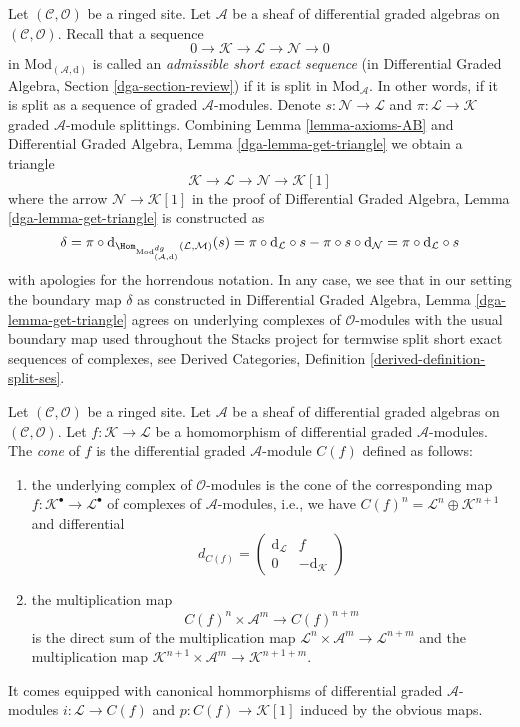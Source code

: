 \noindent
Let $(\mathcal{C}, \mathcal{O})$ be a ringed site.
Let $\mathcal{A}$ be a sheaf of differential graded algebras
on $(\mathcal{C}, \mathcal{O})$.
Recall that a sequence
$$
0 \to \mathcal{K} \to \mathcal{L} \to \mathcal{N} \to 0
$$
in $\text{Mod}_{(\mathcal{A}, \text{d})}$
is called an {\it admissible short exact sequence}
(in Differential Graded Algebra, Section \ref{dga-section-review})
if it is split in $\text{Mod}_\mathcal{A}$. In other words, if it is split
as a sequence of graded $\mathcal{A}$-modules. Denote
$s : \mathcal{N} \to \mathcal{L}$ and
$\pi : \mathcal{L} \to \mathcal{K}$
graded $\mathcal{A}$-module splittings.
Combining Lemma \ref{lemma-axioms-AB} and 
Differential Graded Algebra, Lemma \ref{dga-lemma-get-triangle}
we obtain a triangle
$$
\mathcal{K} \to \mathcal{L} \to \mathcal{N} \to \mathcal{K}[1]
$$
where the arrow $\mathcal{N} \to \mathcal{K}[1]$ in the proof
of Differential Graded Algebra, Lemma \ref{dga-lemma-get-triangle}
is constructed as
$$
\delta = \pi \circ
\text{d}_{\Hom_{\text{Mod}^{dg}_{(\mathcal{A}, \text{d})}}
(\mathcal{L}, \mathcal{M})}(s) =
\pi \circ \text{d}_\mathcal{L} \circ s -
\pi \circ s \circ \text{d}_\mathcal{N} =
\pi \circ \text{d}_\mathcal{L} \circ s
$$
with apologies for the horrendous notation. In any case, we see that
in our setting the boundary map $\delta$ as constructed in
Differential Graded Algebra, Lemma \ref{dga-lemma-get-triangle}
agrees on underlying complexes of $\mathcal{O}$-modules
with the usual boundary map used throughout the Stacks project
for termwise split short exact sequences of complexes, see
Derived Categories, Definition \ref{derived-definition-split-ses}.

\begin{definition}
\label{definition-cone}
Let $(\mathcal{C}, \mathcal{O})$ be a ringed site.
Let $\mathcal{A}$ be a sheaf of differential graded algebras
on $(\mathcal{C}, \mathcal{O})$.
Let $f : \mathcal{K} \to \mathcal{L}$
be a homomorphism of differential graded $\mathcal{A}$-modules.
The {\it cone} of $f$ is the differential graded $\mathcal{A}$-module
$C(f)$ defined as follows:
\begin{enumerate}
\item the underlying complex of $\mathcal{O}$-modules
is the cone of the corresponding map
$f : \mathcal{K}^\bullet \to \mathcal{L}^\bullet$ of
complexes of $\mathcal{A}$-modules, i.e., we have
$C(f)^n = \mathcal{L}^n \oplus \mathcal{K}^{n + 1}$ and
differential
$$
d_{C(f)} =
\left(
\begin{matrix}
\text{d}_\mathcal{L} & f \\
0 & -\text{d}_\mathcal{K}
\end{matrix}
\right)
$$
\item the multiplication map
$$
C(f)^n \times \mathcal{A}^m \to C(f)^{n + m}
$$
is the direct sum of the multiplication map
$\mathcal{L}^n \times \mathcal{A}^m \to \mathcal{L}^{n + m}$
and the multiplication map
$\mathcal{K}^{n + 1} \times \mathcal{A}^m \to \mathcal{K}^{n + 1 + m}$.
\end{enumerate}
It comes equipped with canonical hommorphisms of differential graded
$\mathcal{A}$-modules $i : \mathcal{L} \to C(f)$
and $p : C(f) \to \mathcal{K}[1]$ induced by the obvious maps.
\end{definition}

